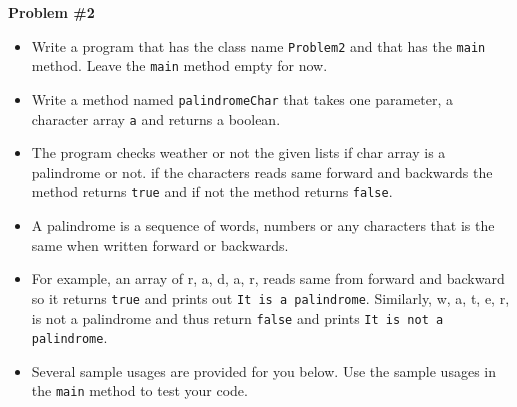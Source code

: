 \documentclass[12pt]{article}
\begin{document}
\vspace*{0.5cm}
\noindent\textbf{Problem \#2}
\begin{itemize}
	\item Write a program that has the class name \texttt{Problem2} and that has the \texttt{main} method. Leave the \texttt{main} method empty for now.
	\item Write a method named \texttt{palindromeChar} that takes one parameter, a character array \texttt{a} and returns a boolean.
	\item The program checks weather or not the given lists if char array is a palindrome or not. if the characters reads same forward and backwards the method returns \texttt{true} and if not the method returns \texttt{false}.
	\item A palindrome is a sequence of words, numbers or any characters that is the same when written forward or backwards.
	\item For example, an array of \textquotesingle r\textquotesingle , \textquotesingle a\textquotesingle, \textquotesingle d\textquotesingle, \textquotesingle a\textquotesingle, \textquotesingle r\textquotesingle, reads same from forward and backward so it returns \texttt{true} and prints out \texttt{It is a palindrome}. Similarly, \textquotesingle w\textquotesingle, \textquotesingle a\textquotesingle, \textquotesingle t\textquotesingle, \textquotesingle e\textquotesingle, \textquotesingle r\textquotesingle, is not a palindrome and thus return \texttt{false} and prints \texttt{It is not a palindrome}.
	\item Several sample usages are provided for you below. Use the sample usages in the \texttt{main} method to test your code.
\end{itemize}
\end{document}

